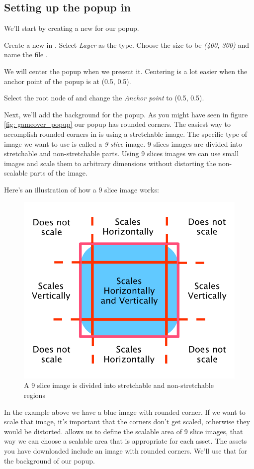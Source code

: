 \subsection{Setting up the popup in \SB{}}
We'll start by creating a new \ccbfile{} for our popup.
\begin{leftbar}
Create a new \ccbfile{} in \SB{}. Select \textit{Layer} as the type. Choose the
size to be \textit{(400, 300)} and name the file .
\end{leftbar}
We will center the popup when we present it. Centering is a lot easier when the
anchor point of the popup is at (0.5, 0.5).
\begin{leftbar}
Select the root node of  and change the
\textit{Anchor point} to (0.5, 0.5).
\end{leftbar} 
Next, we'll add the background for the popup. As you might have seen in figure
\ref{fig: gameover_popup} our popup has rounded corners. The easiest way to
accomplish rounded corners in \cocos{} is using a stretchable image.
 The specific type of image we want to use is called a \textit{9 slice} image. 9
 slices images are divided into stretchable and non-stretchable parts. Using 9 slices images we can
use small images and scale them to arbitrary dimensions without distorting the
non-scalable parts of the image.

Here's an illustration of how a 9 slice image works:
\begin{figure}[H]
    \centering
    \includegraphics[width=0.5\linewidth]{images/Chapter7/9_slice.png}
    \caption{A 9 slice image is divided into stretchable and non-stretchable
    regions}
\end{figure}

In the example above we have a blue image with rounded corner. If we want to
scale that image, it's important that the corners don't get scaled, otherwise
they would be distorted. \SB{} allows us to define the scalable area of 9 slice
images, that way we can choose a scalable area that is appropriate for each
asset. The assets you have downloaded include an image with rounded corners.
We'll use that for the background of our popup.

